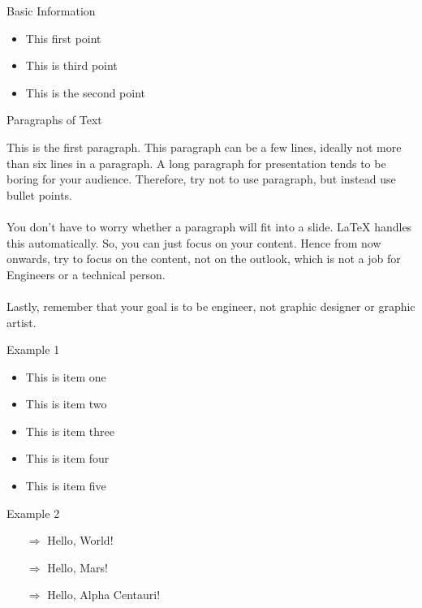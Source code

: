 \documentclass{beamer}
\begin{document}
\begin{frame}{Basic Information }
	\begin{itemize}
		\item<4-> This first point 
		\item<3-> This is third point  
		\item<2->  This is the second point 
	\end{itemize}
\end{frame}


\begin{frame}{Paragraphs of Text}

This is the first paragraph.  This paragraph can be a few lines, ideally not more than six lines in a paragraph.  A long paragraph for presentation tends to be boring for your audience.  Therefore, try not to use paragraph, but instead use bullet points.\\~\\
You don't have to worry whether a paragraph will fit into a slide.  LaTeX handles this automatically.  So, you can just focus on your content.  Hence from now onwards, try to focus on the content, not on the outlook, which is not a job for Engineers or a technical person. \\~\\

Lastly, remember that your goal is to be engineer, not graphic designer or graphic artist.
\end{frame}

\begin{frame}{Example 1}
\begin{itemize}
\item <+-> This is item \alert{one}
\item <+-> This is item two
\item <+-> This is item three
\item <+-> This is item four
\item <+-> This is item five
\end{itemize}
\end{frame}

\begin{frame}{Example 2}
\begin{itemize}
\item [$\Rightarrow$] Hello, World!
\pause
\item [$\Rightarrow$] Hello, Mars!
\pause
\item [$\Rightarrow$] Hello, Alpha Centauri!
\end{itemize}
\end{frame}
\end{document}
